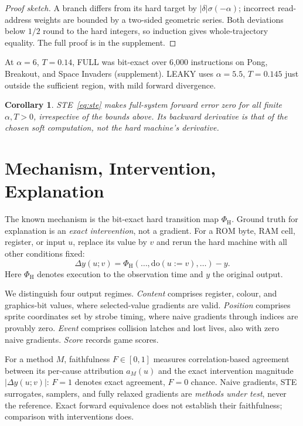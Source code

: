 \documentclass[letterpaper]{article} %
\newtheorem{corollary}{Corollary}
\begin{document}
\begin{proof}[Proof sketch]
A branch differs from its hard target by
$|\delta|\sigma(-\alpha)$; incorrect read-address
weights are bounded by a two-sided geometric series.
Both deviations below $1/2$ round to the hard
integers, so induction gives whole-trajectory equality.
The full proof is in the supplement.
\end{proof}

At $\alpha=6$, $T=0.14$, FULL was bit-exact over
6,000 instructions on Pong, Breakout, and Space
Invaders (supplement). LEAKY uses $\alpha=5.5$,
$T=0.145$ just outside the sufficient region,
with mild forward divergence.

\begin{corollary}
\label{cor:ste}
STE~\eqref{eq:ste} makes full-system forward error
zero for all finite $\alpha,T>0$, irrespective of
the bounds above. Its backward derivative is that
of the chosen soft computation, not the hard
machine's derivative.
\end{corollary}

\section{Mechanism, Intervention, Explanation}

The known mechanism is the bit-exact hard transition
map $\Phi_{\mathrm{H}}$. Ground truth for explanation
is an \emph{exact intervention}, not a gradient.
For a ROM byte, RAM cell, register, or input $u$,
replace its value by $v$ and rerun the hard machine
with all other conditions fixed:
\begin{equation}
\Delta y(u;v)=
\Phi_{\mathrm{H}}(\ldots,\mathrm{do}(u:=v),\ldots)-y.
\label{eq:intervention}
\end{equation}
Here $\Phi_{\mathrm{H}}$ denotes execution to the
observation time and $y$ the original output.

We distinguish four output regimes.
\emph{Content} comprises register, colour, and
graphics-bit values, where selected-value gradients
are valid. \emph{Position} comprises sprite coordinates
set by strobe timing, where naive gradients through
indices are provably zero. \emph{Event} comprises
collision latches and lost lives, also with zero
naive gradients. \emph{Score} records game scores.

For a method $M$, faithfulness $F\in[0,1]$
measures correlation-based agreement between its
per-cause attribution $a_M(u)$ and the exact
intervention magnitude $|\Delta y(u;v)|$:
$F=1$ denotes exact agreement, $F=0$ chance.
Naive gradients, STE surrogates, samplers, and
fully relaxed gradients are \emph{methods under test},
never the reference. Exact forward equivalence
does not establish their faithfulness; comparison
with interventions does.
\end{document}
